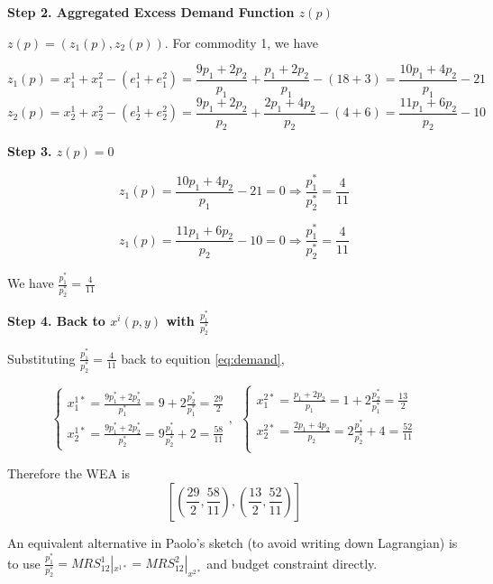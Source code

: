 \documentclass{article}
\begin{document}
\vspace{3mm}

\textbf{Step 2. Aggregated Excess Demand Function $z(p)$}

\vspace{3mm}

$z(p) = (z_1(p),z_2(p))$. For commodity 1, we have

$$z_1(p) = x^1_1 + x^2_1 - (e^1_1 + e^2_1)= \frac{9p_1+2p_2}{p_1} + \frac{p_1+2p_2}{p_1} - (18 +3) = \frac{10p_1+4p_2}{p_1}-21 $$
$$z_2(p) = x^1_2 + x^2_2 - (e^1_2 + e^2_2) = \frac{9p_1+2p_2}{p_2}  + \frac{2p_1+4p_2}{p_2}  - (4+6) = \frac{11p_1+6p_2}{p_2} -10$$

\textbf{Step 3. $z(p) = 0$}


$$z_1(p) = \frac{10p_1+4p_2}{p_1}-21 =0 \Rightarrow \frac{p_1^*}{p_2^*} = \frac{4}{11}$$

$$z_1(p) = \frac{11p_1+6p_2}{p_2} -10 =0 \Rightarrow \frac{p_1^*}{p_2^*} = \frac{4}{11}$$


We have $\frac{p_1^*}{p_2^*} = \frac{4}{11}$

\textbf{Step 4. Back to $x^i(p,y)$ with $\frac{p_1^*}{p_2^*}$}


Substituting $\frac{p_1^*}{p_2^*} = \frac{4}{11}$ back to equition \ref{eq:demand},


\begin{equation}
    \begin{cases}
x^{1*}_1 = \frac{9p^*_1+2p^*_2}{p^*_1} = 9+ 2\frac{p_2^*}{p_1^*} = \frac{29}{2} \\
x^{1*}_2 = \frac{9p^*_1+2p^*_2}{p^*_2} = 9\frac{p_1^*}{p_2^*} +2 =
\frac{58}{11}    \end{cases}
, \ \
    \begin{cases}
x^{2*}_1 = \frac{p_1+2p_2}{p_1} =1 + 2\frac{p_2^*}{p_1^*} = \frac{13}{2} \\
x^{2*}_2 = \frac{2p_1+4p_2}{p_2} =  2\frac{p_1^*}{p_2^*} +4= \frac{52}{11}\\
    \end{cases}
\label{eq:wea}
\end{equation}


Therefore the WEA is $$[(\frac{29}{2},\frac{58}{11} ),(\frac{13}{2},\frac{52}{11})]$$

\begin{mdframed}[backgroundcolor=blue!20,linecolor=white]

An equivalent alternative in Paolo's sketch (to avoid writing down Lagrangian) is to use $\frac{p^*_1}{p^*_2} = MRS^1_{12} |_{x^{1*}} = MRS^2_{12}|_{x^{2*}}$ and budget constraint directly. 

\end{mdframed}
\end{document}
